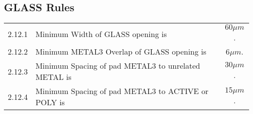 \subsection{GLASS Rules}\label{design_rules_glass_rules}

\begin{flushleft}
    \begin{tabular}{c l c}
        2.12.1  & Minimum Width of GLASS opening is & $60 \mu m$. \\
        2.12.2  & Minimum METAL3 Overlap of GLASS opening is & $6 \mu m$. \\
        2.12.3  & Minimum Spacing of pad METAL3 to unrelated METAL is & $30 \mu m$. \\
        2.12.4  & Minimum Spacing of pad METAL3 to ACTIVE or POLY is & $15 \mu m$. \\
    \end{tabular}
\end{flushleft}


